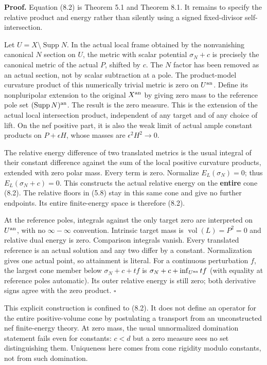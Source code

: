 \documentclass[
  10pt,
]{article}
\begin{document}
\textbf{Proof.} Equation (8.2) is Theorem 5.1 and Theorem 8.1. It
remains to specify the relative product and energy rather than silently
using a signed fixed-divisor self-intersection.

Let \(U=X\setminus\operatorname{Supp}N\). In the actual local frame
obtained by the nonvanishing canonical \(N\) section on \(U\), the
metric with scalar potential \(\sigma_N+c\) is precisely the canonical
metric of the actual \(P\), shifted by \(c\). The \(N\) factor has been
removed as an actual section, not by scalar subtraction at a pole. The
product-model curvature product of this numerically trivial metric is
zero on \(U^{\rm an}\). Define its nonpluripolar extension to the
original \(X^{\rm an}\) by giving zero mass to the reference pole set
\((\operatorname{Supp}N)^{\rm an}\). The result is the zero measure.
This is the extension of the actual local intersection product,
independent of any target and of any choice of lift. On the nef positive
part, it is also the weak limit of actual ample constant products on
\(P+\epsilon H\), whose masses are \(\epsilon^2H^2\to0\).

The relative energy difference of two translated metrics is the usual
integral of their constant difference against the sum of the local
positive curvature products, extended with zero polar mass. Every term
is zero. Normalize \(E_L(\sigma_N)=0\); thus \(E_L(\sigma_N+c)=0\). This
constructs the actual relative energy on the \textbf{entire} cone (8.2).
The relative floors in (5.8) stay in this same cone and give no further
endpoints. Its entire finite-energy space is therefore (8.2).

At the reference poles, integrals against the only target zero are
interpreted on \(U^{\rm an}\), with no \(\infty-\infty\) convention.
Intrinsic target mass is \(\operatorname{vol}(L)=P^2=0\) and relative
dual energy is zero. Comparison integrals vanish. Every translated
reference is an actual solution and any two differ by a constant.
Normalization gives one actual point, so attainment is literal. For a
continuous perturbation \(f\), the largest cone member below
\(\sigma_N+c+tf\) is \(\sigma_N+c+\inf_{U^{\rm an}}tf\) (with equality
at reference poles automatic). Its outer relative energy is still zero;
both derivative signs agree with the zero product. \(\square\)

This explicit construction is confined to (8.2). It does not define an
operator for the entire positive-volume cone by postulating a transport
from an unconstructed nef finite-energy theory. At zero mass, the usual
unnormalized domination statement fails even for constants: \(c<d\) but
a zero measure sees no set distinguishing them. Uniqueness here comes
from cone rigidity modulo constants, not from such domination.
\end{document}
